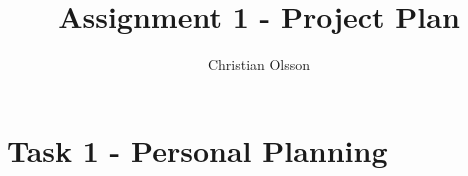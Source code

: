 \documentclass[fleqn,a4paper,11pt]{article}
\title{Assignment 1 - Project Plan}
\author{Christian Olsson}
\begin{document}
\maketitle                      %

\thispagestyle{empty}           %

\newpage                        %

\section{Task 1 - Personal Planning}
\end{document}
